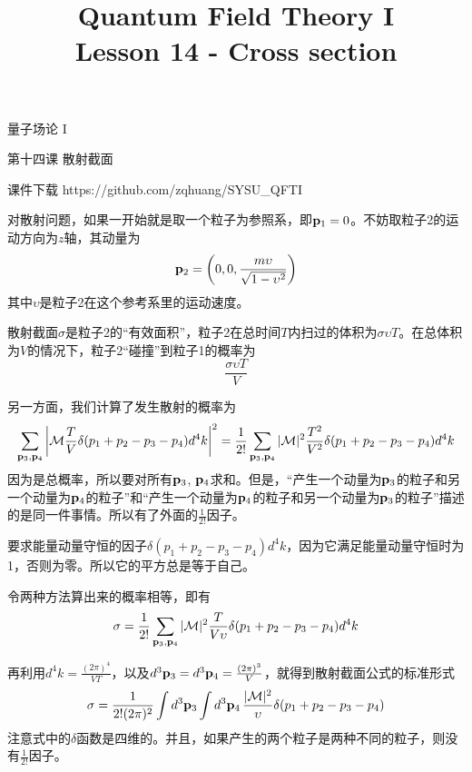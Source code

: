 \documentclass[CJK]{beamer}
\title{Quantum Field Theory I \\ Lesson 14 - Cross section}
\author{}
\date{}
\begin{document}
\begin{frame}
 
\begin{center}
\begin{Large}
\bch
量子场论 I 

{\vskip 0.3in}

第十四课 散射截面

\ech
\end{Large}
\end{center}

\vskip 0.2in

\bch
课件下载
\ech
https://github.com/zqhuang/SYSU\_QFTI

\end{frame}

\begin{frame}
\bch
对散射问题，如果一开始就是取一个粒子为参照系，即${\mathbf{p}}_1 = 0$。不妨取粒子2的运动方向为$z$轴，其动量为
$${\mathbf{p}}_2 = \left(0, 0, \frac{m\upsilon}{\sqrt{1-\upsilon^2}}\right)$$
其中$\upsilon$是粒子2在这个参考系里的运动速度。
\skipline

散射截面$\sigma$是粒子2的“有效面积”，粒子2在总时间$T$内扫过的体积为$\sigma \upsilon T$。在总体积为$V$的情况下，粒子2“碰撞”到粒子1的概率为
$$\frac{\sigma \upsilon T}{V}$$


\ech
\end{frame}


\begin{frame}
\bch
另一方面，我们计算了发生散射的概率为
{\small
$$ \sum_{{\mathbf{p}}_3, {\mathbf{p}}_4} \left\vert{\mathcal{M}} \frac{T}{V}  \delta(p_1+p_2-p_3-p_4) d^4k\right\vert^2 = \frac{1}{2!}\sum_{{\mathbf{p}}_3, {\mathbf{p}}_4} |{\mathcal{M}}|^2 \frac{T^2}{V^2}  \delta(p_1+p_2-p_3-p_4) d^4k $$
}
因为是总概率，所以要对所有${\mathbf{p}}_3$, ${\mathbf{p}}_4$求和。但是，“产生一个动量为${\mathbf{p}}_3$的粒子和另一个动量为${\mathbf{p}}_4$的粒子”和“产生一个动量为${\mathbf{p}}_4$的粒子和另一个动量为${\mathbf{p}}_3$的粒子”描述的是同一件事情。所以有了外面的$\frac{1}{2!}$因子。

要求能量动量守恒的因子$\delta(p_1+p_2-p_3-p_4) d^4k$，因为它满足能量动量守恒时为1，否则为零。所以它的平方总是等于自己。

\skipline 
令两种方法算出来的概率相等，即有
$$\sigma  = \frac{1}{2!}\sum_{{\mathbf{p}}_3, {\mathbf{p}}_4} |{\mathcal{M}}|^2 \frac{T}{V\upsilon}  \delta(p_1+p_2-p_3-p_4) d^4k $$
\ech
\end{frame}


\begin{frame}
\bch
再利用$d^4k = \frac{(2\pi)^4}{VT}$，以及$d^3{\mathbf{p}}_3 = d^3{\mathbf{p}}_4 = \frac{(2\pi)^3}{V}$，就得到散射截面公式的标准形式
$$\sigma  = \frac{1}{2!(2\pi)^2} \int d^3{\mathbf{p}}_3 \int d^3{\mathbf{p}}_4\, \frac{|{\mathcal{M}}|^2}{\upsilon}  \delta(p_1+p_2-p_3-p_4)  $$
注意式中的$\delta$函数是四维的。并且，如果产生的两个粒子是两种不同的粒子，则没有$\frac{1}{2!}$因子。

\ech
\end{frame}
\end{document}
